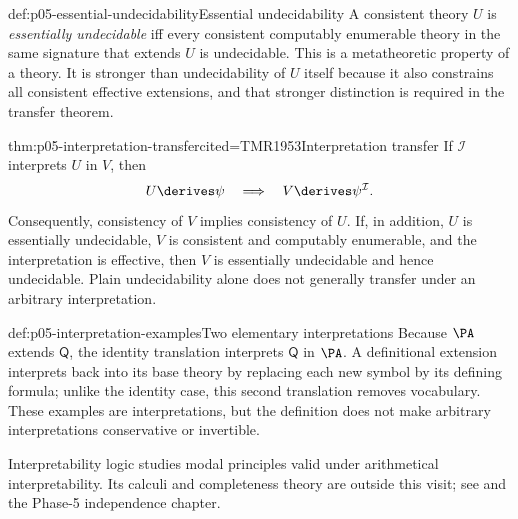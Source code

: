 \begin{hbdefinition}{def:p05-essential-undecidability}{Essential undecidability}
A consistent theory \(U\) is \emph{essentially undecidable} iff every
consistent computably enumerable theory in the same signature that
extends \(U\) is undecidable.  This is a metatheoretic property of a
theory.  It is stronger than undecidability of \(U\) itself because it
also constrains all consistent effective extensions, and that stronger
distinction is required in the transfer theorem.
\end{hbdefinition}

\begin{hbtheorem}{thm:p05-interpretation-transfer}{cited=TMR1953}{Interpretation transfer}
If \(\mathcal I\) interprets \(U\) in \(V\), then
\[
  U\derives\psi\quad\Longrightarrow\quad
  V\derives\psi^{\mathcal I}.
\]
Consequently, consistency of \(V\) implies consistency of \(U\).  If,
in addition, \(U\) is essentially undecidable, \(V\) is consistent and
computably enumerable, and the interpretation is effective, then \(V\)
is essentially undecidable and hence undecidable.  Plain undecidability
alone does not generally transfer under an arbitrary interpretation.
\end{hbtheorem}

\begin{hbexample}{def:p05-interpretation-examples}{Two elementary interpretations}
Because \(\PA\) extends \(\mathsf Q\), the identity translation interprets
\(\mathsf Q\) in \(\PA\).  A definitional extension interprets back into
its base theory by replacing each new symbol by its defining formula;
unlike the identity case, this second translation removes vocabulary.
These examples are interpretations, but the definition does not make
arbitrary interpretations conservative or invertible.
\end{hbexample}

Interpretability logic studies modal principles valid under arithmetical
interpretability.  Its calculi and completeness theory are outside this
visit; see \cite{Visser1997} and the Phase-5 independence chapter.
